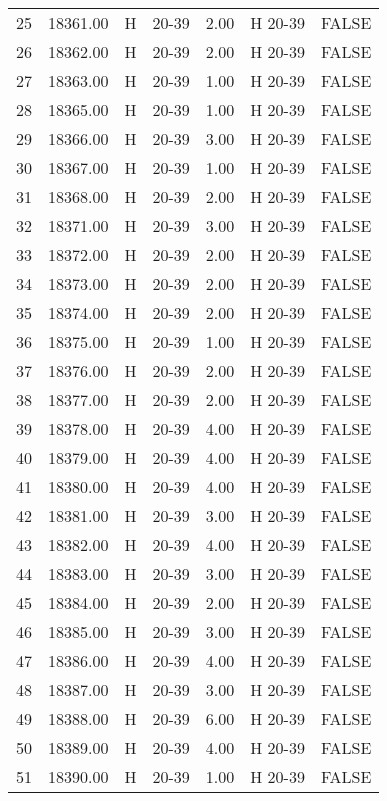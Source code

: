 \begin{table}[ht]
\begin{tabular}{rrllrll}
  25 & 18361.00 & H & 20-39 & 2.00 & H 20-39 & FALSE \\ 
  26 & 18362.00 & H & 20-39 & 2.00 & H 20-39 & FALSE \\ 
  27 & 18363.00 & H & 20-39 & 1.00 & H 20-39 & FALSE \\ 
  28 & 18365.00 & H & 20-39 & 1.00 & H 20-39 & FALSE \\ 
  29 & 18366.00 & H & 20-39 & 3.00 & H 20-39 & FALSE \\ 
  30 & 18367.00 & H & 20-39 & 1.00 & H 20-39 & FALSE \\ 
  31 & 18368.00 & H & 20-39 & 2.00 & H 20-39 & FALSE \\ 
  32 & 18371.00 & H & 20-39 & 3.00 & H 20-39 & FALSE \\ 
  33 & 18372.00 & H & 20-39 & 2.00 & H 20-39 & FALSE \\ 
  34 & 18373.00 & H & 20-39 & 2.00 & H 20-39 & FALSE \\ 
  35 & 18374.00 & H & 20-39 & 2.00 & H 20-39 & FALSE \\ 
  36 & 18375.00 & H & 20-39 & 1.00 & H 20-39 & FALSE \\ 
  37 & 18376.00 & H & 20-39 & 2.00 & H 20-39 & FALSE \\ 
  38 & 18377.00 & H & 20-39 & 2.00 & H 20-39 & FALSE \\ 
  39 & 18378.00 & H & 20-39 & 4.00 & H 20-39 & FALSE \\ 
  40 & 18379.00 & H & 20-39 & 4.00 & H 20-39 & FALSE \\ 
  41 & 18380.00 & H & 20-39 & 4.00 & H 20-39 & FALSE \\ 
  42 & 18381.00 & H & 20-39 & 3.00 & H 20-39 & FALSE \\ 
  43 & 18382.00 & H & 20-39 & 4.00 & H 20-39 & FALSE \\ 
  44 & 18383.00 & H & 20-39 & 3.00 & H 20-39 & FALSE \\ 
  45 & 18384.00 & H & 20-39 & 2.00 & H 20-39 & FALSE \\ 
  46 & 18385.00 & H & 20-39 & 3.00 & H 20-39 & FALSE \\ 
  47 & 18386.00 & H & 20-39 & 4.00 & H 20-39 & FALSE \\ 
  48 & 18387.00 & H & 20-39 & 3.00 & H 20-39 & FALSE \\ 
  49 & 18388.00 & H & 20-39 & 6.00 & H 20-39 & FALSE \\ 
  50 & 18389.00 & H & 20-39 & 4.00 & H 20-39 & FALSE \\ 
  51 & 18390.00 & H & 20-39 & 1.00 & H 20-39 & FALSE \\ 

\end{tabular}
\end{table}
